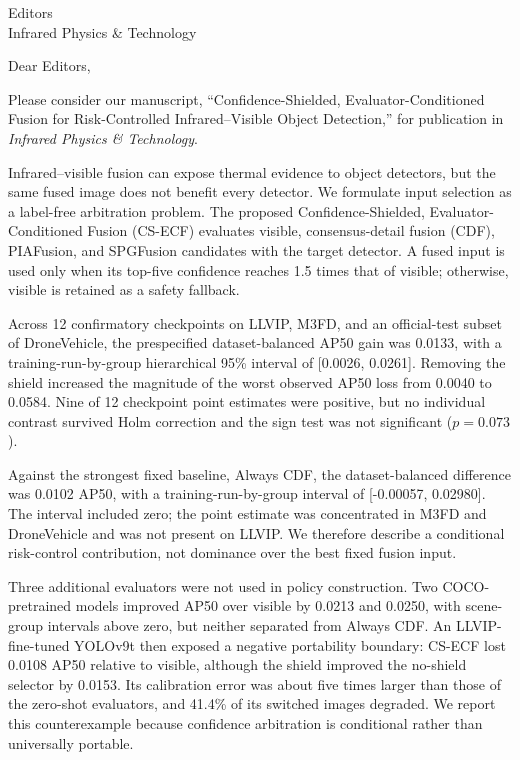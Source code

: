 \documentclass[a4paper,10pt]{letter}
\begin{document}
\sloppy
\begin{letter}{Editors\\Infrared Physics \& Technology}
\opening{Dear Editors,}

Please consider our manuscript, ``Confidence-Shielded,
Evaluator-Conditioned Fusion for Risk-Controlled Infrared--Visible Object
Detection,'' for publication in \emph{Infrared Physics \& Technology}.

Infrared--visible fusion can expose thermal evidence to object detectors, but
the same fused image does not benefit every detector. We formulate input
selection as a label-free arbitration problem. The proposed
Confidence-Shielded, Evaluator-Conditioned Fusion (CS-ECF) evaluates visible,
consensus-detail fusion (CDF), PIAFusion, and SPGFusion candidates with the
target detector. A fused input is used only when its top-five confidence reaches
1.5 times that of visible; otherwise, visible is retained as a safety fallback.

Across 12 confirmatory checkpoints on LLVIP, M3FD, and an official-test subset
of DroneVehicle, the prespecified dataset-balanced AP50 gain was 0.0133, with a
training-run-by-group hierarchical 95\% interval of [0.0026, 0.0261].
Removing the shield increased the magnitude of the worst observed AP50 loss
from 0.0040 to 0.0584. Nine of 12 checkpoint point estimates were positive, but
no individual contrast survived Holm correction and the sign test was not significant
(\(p=0.073\)).

Against the strongest fixed baseline, Always CDF, the dataset-balanced difference was
0.0102 AP50, with a training-run-by-group interval of [-0.00057, 0.02980].
The interval included zero; the point estimate was concentrated in M3FD and
DroneVehicle and was not present on LLVIP. We therefore describe a
conditional risk-control contribution, not dominance over the best fixed fusion
input.

Three additional evaluators were not used in policy construction. Two
COCO-pretrained models improved AP50 over visible by 0.0213 and 0.0250, with
scene-group intervals above zero, but neither separated from Always CDF. An
LLVIP-fine-tuned YOLOv9t then exposed a negative portability boundary: CS-ECF
lost 0.0108 AP50 relative to visible, although the shield improved the
no-shield selector by 0.0153. Its calibration error was about five times larger
than those of the zero-shot evaluators, and 41.4\% of its switched images
degraded. We report this counterexample because confidence arbitration is
conditional rather than universally portable.


\end{letter}
\end{document}
